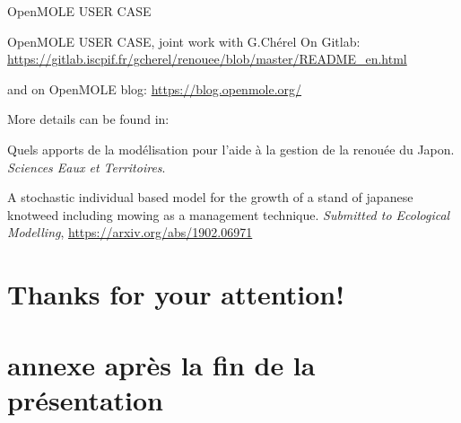 \documentclass{myBeamer}
\begin{document}
\begin{frame}{OpenMOLE USER CASE} %

\textcolor{primaryGreenOM}{OpenMOLE USER CASE}, joint work with G.Chérel
\smallbreak
On Gitlab:
\smallbreak
\url{https://gitlab.iscpif.fr/gcherel/renouee/blob/master/README_en.html}

\bigbreak

and on \textcolor{primaryGreenOM}{OpenMOLE blog}:
\smallbreak
\url{https://blog.openmole.org/}


\bigbreak

More details can be found in:

\cite{lavalleeQuelsApportsModelisation}
Quels apports de la modélisation pour l’aide à la gestion de la renouée du Japon. \textit{Sciences Eaux et Territoires}.

\smallbreak
\cite{lavalleeAStochasticIndividual}
A stochastic individual based model for the growth of a stand of japanese knotweed including mowing as a management technique. \textit{Submitted to Ecological Modelling}, \url{https://arxiv.org/abs/1902.06971}



\end{frame}



\section{Thanks for your attention!}







\section*{annexe après la fin de la présentation}
\end{document}
